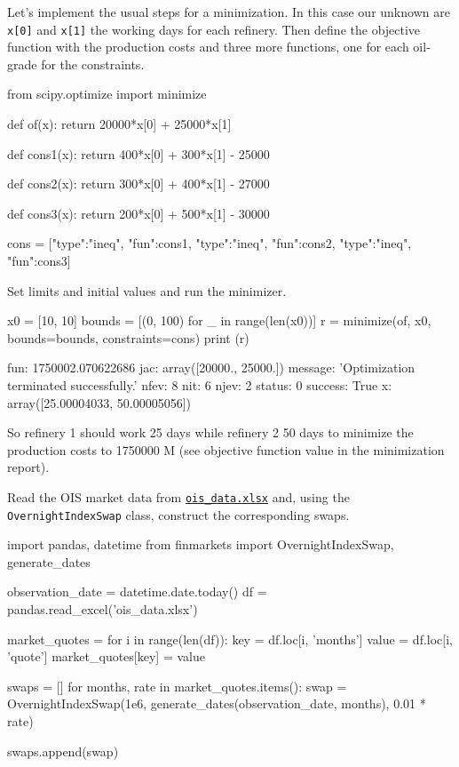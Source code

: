 \cprotEnv\begin{solution}
Let's implement the usual steps for a minimization. In this case our unknown are \texttt{x[0]} and \texttt{x[1]} the working days for each refinery. Then define the objective function with the production costs and three more functions, one for each oil-grade for the constraints.

\begin{ipython}
from scipy.optimize import minimize

def of(x):
    return 20000*x[0] + 25000*x[1]

def cons1(x):
    return 400*x[0] + 300*x[1] - 25000

def cons2(x):
    return 300*x[0] + 400*x[1] - 27000

def cons3(x):
    return 200*x[0] + 500*x[1] - 30000

cons = [{"type":"ineq", "fun":cons1},
        {"type":"ineq", "fun":cons2},
        {"type":"ineq", "fun":cons3}]
\end{ipython}
Set limits and initial values and run the minimizer.
\begin{ipython}
x0 = [10, 10]
bounds = [(0, 100) for _ in range(len(x0))]
r = minimize(of, x0, bounds=bounds, constraints=cons)
print (r)
\end{ipython}
\begin{ioutput}
     fun: 1750002.070622686
     jac: array([20000., 25000.])
 message: 'Optimization terminated successfully.'
    nfev: 8
     nit: 6
    njev: 2
  status: 0
 success: True
       x: array([25.00004033, 50.00005056])
\end{ioutput}    
So refinery 1 should work 25 days while refinery 2 50 days to minimize the production costs to 1750000 M (see objective function value in the minimization report).
\end{solution}

\begin{question}
Read the OIS market data from \href{https://github.com/matteosan1/finance_course/blob/develop/libro/input_files/ois_data.xlsx}{\texttt{ois\_data.xlsx}} and, using the \texttt{OvernightIndexSwap} class, construct the corresponding swaps.
\end{question}

\cprotEnv\begin{solution}

\begin{ipython}
import pandas, datetime
from finmarkets import OvernightIndexSwap, generate_dates

observation_date = datetime.date.today()
df = pandas.read_excel('ois_data.xlsx')

market_quotes = {}
for i in range(len(df)):
    key = df.loc[i, 'months']
    value = df.loc[i, 'quote']
    market_quotes[key] = value

swaps = []
for months, rate in market_quotes.items():
    swap = OvernightIndexSwap(1e6,
        generate_dates(observation_date, months),
        0.01 * rate)

swaps.append(swap)
\end{ipython}
\end{solution}

